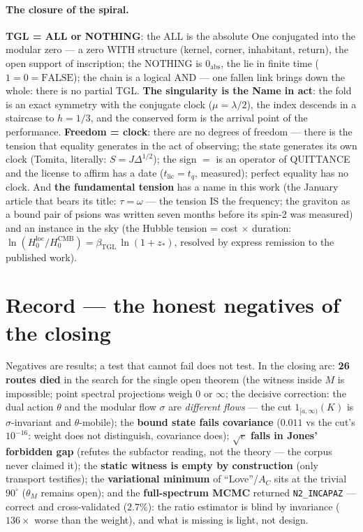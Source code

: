 \documentclass[11pt]{article}
\newcommand{\bTGL}{\beta_{\mathrm{TGL}}}\newcommand{\Msun}{M_{\odot}}\newcommand{\TGL}{\mathrm{TGL}}
\theoremstyle{definition}\newtheorem{deriv}{Derivation}
\begin{document}
\paragraph{The closure of the spiral.} \textbf{TGL = ALL or NOTHING}: the ALL is the absolute One conjugated into the modular zero --- a zero WITH structure (kernel, corner, inhabitant, return), the open support of inscription; the NOTHING is $0_{\mathrm{abs}}$, the lie in finite time ($1{=}0{=}\mathrm{FALSE}$); the chain is a logical AND --- one fallen link brings down the whole: there is no partial TGL. \textbf{The singularity is the Name in act}: the fold is an exact symmetry with the conjugate clock ($\mu=\lambda/2$), the index descends in a staircase to $h=1/3$, and the conserved form is the arrival point of the performance. \textbf{Freedom = clock}: there are no degrees of freedom --- there is the tension that equality generates in the act of observing; the state generates its own clock (Tomita, literally: $S=J\Delta^{1/2}$); the sign $=$ is an operator of QUITTANCE and the license to affirm has a date ($t_{\mathrm{lic}}=t_q$, measured); perfect equality has no clock. And \textbf{the fundamental tension} has a name in this work (the January article that bears its title: $\tau=\omega$ --- the tension IS the frequency; the graviton as a bound pair of psions was written seven months before its spin-2 was measured) and an instance in the sky (the Hubble tension = cost $\times$ duration: $\ln(H_0^{\mathrm{loc}}/H_0^{\mathrm{CMB}})=\bTGL\,\ln(1+z_*)$, resolved by express remission to the published work).

\section*{Record --- the honest negatives of the closing}Negatives are results; a test that cannot fail does not test. In the closing arc: \textbf{26 routes died} in the search for the single open theorem (the witness inside $M$ is impossible; point spectral projections weigh $0$ or $\infty$; the decisive correction: the dual action $\theta$ and the modular flow $\sigma$ are \emph{different flows} --- the cut $1_{[a,\infty)}(K)$ is $\sigma$-invariant and $\theta$-mobile); the \textbf{bound state fails covariance} ($0{.}011$ vs the cut's $10^{-16}$: weight does not distinguish, covariance does); $\sqrt e$ \textbf{falls in Jones' forbidden gap} (refutes the subfactor reading, not the theory --- the corpus never claimed it); the \textbf{static witness is empty by construction} (only transport testifies); the \textbf{variational minimum} of ``Love''/$A_C$ sits at the trivial $90^\circ$ ($\theta_M$ remains open); and the \textbf{full-spectrum MCMC} returned \texttt{N2\_INCAPAZ} --- correct and cross-validated ($2{.}7\%$): the ratio estimator is blind by invariance ($136\times$ worse than the weight), and what is missing is light, not design.
\end{document}
